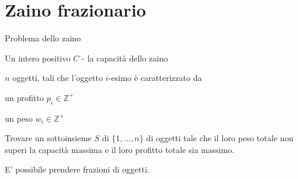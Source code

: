 \section{Zaino frazionario}

\begin{frame}{Problema dello zaino}

\vspace{-6pt}
\begin{myboxtitle}[Input]
\BIL
\item Un intero positivo $C$  - la capacità dello zaino
\item $n$ oggetti, tali che l'oggetto $i$-esimo è caratterizzato da
  \BI
	\item un profitto $p_i \in \mathbb{Z^+}$  
  \item un peso $w_i \in \mathbb{Z^+}$
	\EI
\EIL
\end{myboxtitle}

	
\begin{myboxtitle}[Zaino 0/1]
Trovare un sottoinsieme $S$ di $\{1, \ldots , n\}$ di oggetti tale che il loro
peso totale non superi la capacità massima e il loro profitto totale sia
massimo.
\end{myboxtitle}

\begin{myboxtitle}
E' possibile prendere frazioni di oggetti.
\end{myboxtitle}

\end{frame}

